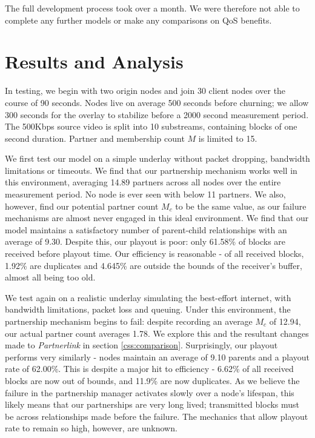 \documentclass[12pt,a4paper]{article}
\begin{document}
The full development process took over a month. We were therefore not able to complete any further models or make any comparisons on QoS benefits.

\section{Results and Analysis} \label{results}
In testing, we begin with two origin nodes and join 30 client nodes over the course of 90 seconds. Nodes live on average 500 seconds before churning; we allow 300 seconds for the overlay to stabilize before a 2000 second measurement period. The 500Kbps source video is split into 10 substreams, containing blocks of one second duration. Partner and membership count \(M\) is limited to 15.

We first test our model on a simple underlay without packet dropping, bandwidth limitations or timeouts. We find that our partnership mechanism works well in this environment, averaging 14.89 partners across all nodes over the entire measurement period. No node is ever seen with below 11 partners. We also, however, find our potential partner count \(M_c\) to be the same value, as our failure mechanisms are almost never engaged in this ideal environment. We find that our model maintains a satisfactory number of parent-child relationships with an average of 9.30. Despite this, our playout is poor:  only 61.58\% of blocks are received before playout time. Our efficiency is reasonable - of all received blocks, 1.92\% are duplicates and 4.645\% are outside the bounds of the receiver's buffer, almost all being too old.

We test again on a realistic underlay simulating the best-effort internet, with bandwidth limitations, packet loss and queuing. Under this environment, the partnership mechanism begins to fail: despite recording an average \(M_c\) of 12.94, our actual partner count averages 1.78. We explore this and the resultant changes made to \textit{Partnerlink} in section \ref{css:comparison}. Surprisingly, our playout performs very similarly - nodes maintain an average of 9.10 parents and a playout rate of 62.00\%. This is despite a major hit to efficiency - 6.62\% of all received blocks are now out of  bounds, and 11.9\% are now duplicates. As we believe the failure in the partnership manager activates slowly over a node's lifespan, this likely means that our partnerships are very long lived; transmitted blocks must be across relationships made before the failure. The mechanics that allow playout rate to remain so high, however, are unknown.
\end{document}
